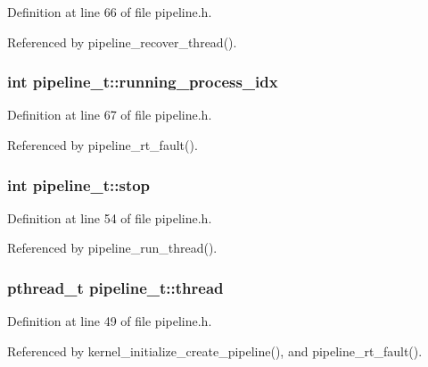 Definition at line 66 of file pipeline.\-h.



Referenced by pipeline\-\_\-recover\-\_\-thread().

\hypertarget{structpipeline__t_a09b2f4bb610224e4f5c9ddcbf81b7874}{
\subsubsection[{running\-\_\-process\-\_\-idx}]{\setlength{\rightskip}{0pt plus 5cm}int pipeline\-\_\-t\-::running\-\_\-process\-\_\-idx}}\label{structpipeline__t_a09b2f4bb610224e4f5c9ddcbf81b7874}


Definition at line 67 of file pipeline.\-h.



Referenced by pipeline\-\_\-rt\-\_\-fault().

\hypertarget{structpipeline__t_ab5d965c3c5c84d69165351e7d7b70e80}{
\subsubsection[{stop}]{\setlength{\rightskip}{0pt plus 5cm}int pipeline\-\_\-t\-::stop}}\label{structpipeline__t_ab5d965c3c5c84d69165351e7d7b70e80}


Definition at line 54 of file pipeline.\-h.



Referenced by pipeline\-\_\-run\-\_\-thread().

\hypertarget{structpipeline__t_ab506a10f907e26976e2784e7b4d3075d}{
\subsubsection[{thread}]{\setlength{\rightskip}{0pt plus 5cm}pthread\-\_\-t pipeline\-\_\-t\-::thread}}\label{structpipeline__t_ab506a10f907e26976e2784e7b4d3075d}


Definition at line 49 of file pipeline.\-h.



Referenced by kernel\-\_\-initialize\-\_\-create\-\_\-pipeline(), and pipeline\-\_\-rt\-\_\-fault().

